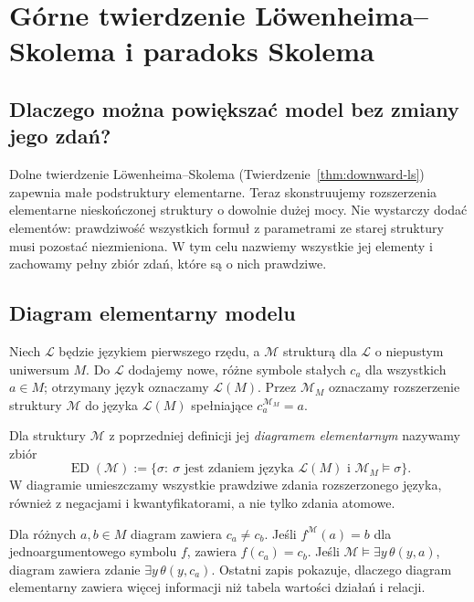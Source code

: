 \chapter{Górne twierdzenie Löwenheima--Skolema i paradoks Skolema}
\label{ch:upward-ls}

\providecommand{\atlasref}[2]{#2}

\section{Dlaczego można powiększać model bez zmiany jego zdań?}
Dolne twierdzenie Löwenheima--Skolema
(Twierdzenie~\ref{thm:downward-ls}) zapewnia małe
podstruktury elementarne. Teraz skonstruujemy rozszerzenia
elementarne nieskończonej struktury o dowolnie dużej mocy.
Nie wystarczy dodać elementów: prawdziwość wszystkich
formuł z parametrami ze starej struktury musi pozostać
niezmieniona. W tym celu nazwiemy wszystkie jej elementy
i zachowamy pełny zbiór zdań, które są o nich prawdziwe.

\section{Diagram elementarny modelu}
\begin{definicja}
\label{def:ls-expanded-language}
Niech $\mathcal L$ będzie językiem pierwszego rzędu,
a $\mathcal M$ strukturą dla $\mathcal L$
o niepustym uniwersum $M$.
Do $\mathcal L$ dodajemy nowe, różne symbole
stałych $c_a$ dla wszystkich $a\in M$;
otrzymany język oznaczamy $\mathcal L(M)$.
Przez $\mathcal M_M$ oznaczamy rozszerzenie
struktury $\mathcal M$ do języka $\mathcal L(M)$
spełniające $c_a^{\mathcal M_M}=a$.
\end{definicja}

\begin{definicja}
\label{def:ls-elementary-diagram}
Dla struktury $\mathcal M$ z poprzedniej definicji
jej \emph{diagramem elementarnym} nazywamy zbiór
\[
\operatorname{ED}(\mathcal M):=
\{\sigma:\ \sigma\text{ jest zdaniem języka }\mathcal L(M)
\text{ i }\mathcal M_M\models\sigma\}.
\]
W diagramie umieszczamy wszystkie prawdziwe zdania
rozszerzonego języka, również z negacjami
i kwantyfikatorami, a nie tylko zdania atomowe.
\end{definicja}

\begin{przyklad}
\label{ex:ls-diagram}
Dla różnych $a,b\in M$ diagram zawiera
$c_a\ne c_b$. Jeśli $f^{\mathcal M}(a)=b$
dla jednoargumentowego symbolu $f$, zawiera
$f(c_a)=c_b$. Jeśli $\mathcal M\models
\exists y\,\theta(y,a)$, diagram zawiera zdanie
$\exists y\,\theta(y,c_a)$. Ostatni zapis
pokazuje, dlaczego diagram elementarny zawiera
więcej informacji niż tabela wartości działań i relacji.
\end{przyklad}

